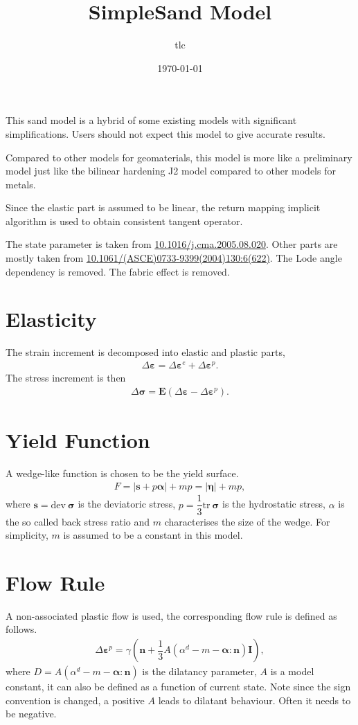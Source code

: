 \documentclass[11pt,fleqn]{article}
\title{SimpleSand Model}\date{\today}\author{tlc}\setlength\parindent{0pt}\setlength{\parskip}{1em}
\newcommand*{\tr}[1]{\mathrm{tr}~#1}
\newcommand*{\dev}[1]{\mathrm{dev}~#1}
\begin{document}
\pagestyle{empty}\maketitle
This sand model is a hybrid of some existing models with significant simplifications. Users should not expect this model to give accurate results.

Compared to other models for geomaterials, this model is more like a preliminary model just like the bilinear hardening J2 model compared to other models for metals.

Since the elastic part is assumed to be linear, the return mapping implicit algorithm is used to obtain consistent tangent operator.

The state parameter is taken from \href{https://doi.org/10.1016/j.cma.2005.08.020}{10.1016/j.cma.2005.08.020}. Other parts are mostly taken from \href{https://doi.org/10.1061/(ASCE)0733-9399(2004)130:6(622)}{10.1061/(ASCE)0733-9399(2004)130:6(622)}. The Lode angle dependency is removed. The fabric effect is removed.
\section{Elasticity}
The strain increment is decomposed into elastic and plastic parts,
\begin{gather*}
\Delta\mathbold{\varepsilon}=\Delta\mathbold{\varepsilon}^e+\Delta\mathbold{\varepsilon}^p.
\end{gather*}
The stress increment is then
\begin{gather*}
\Delta\mathbold{\sigma}=\mathbold{E}\left(\Delta\mathbold{\varepsilon}-\Delta\mathbold{\varepsilon}^p\right).
\end{gather*}
\section{Yield Function}
A wedge-like function is chosen to be the yield surface.
\begin{gather*}
F=\big|\mathbold{s}+p\mathbold{\alpha}\big|+mp=\big|\mathbold{\eta}\big|+mp,
\end{gather*}
where $\mathbold{s}=\dev{\mathbold{\sigma}}$ is the deviatoric stress, $p=\dfrac{1}{3}\tr{\mathbold{\sigma}}$ is the hydrostatic stress, $\alpha$ is the so called back stress ratio and $m$ characterises the size of the wedge. For simplicity, $m$ is assumed to be a constant in this model.
\section{Flow Rule}
A non-associated plastic flow is used, the corresponding flow rule is defined as follows.
\begin{gather*}
\Delta\mathbold{\varepsilon}^p=\gamma\left(\mathbold{n}+\dfrac{1}{3}A\left(\alpha^d-m-\mathbold{\alpha}:\mathbold{n}\right)\mathbold{I}\right),
\end{gather*}
where $D=A\left(\alpha^d-m-\mathbold{\alpha}:\mathbold{n}\right)$ is the dilatancy parameter, $A$ is a model constant, it can also be defined as a function of current state. Note since the sign convention is changed, a positive $A$ leads to dilatant behaviour. Often it needs to be negative.
\end{document}

